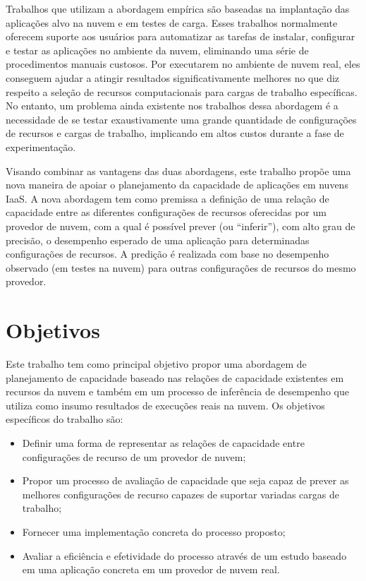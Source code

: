 Trabalhos que utilizam a abordagem empírica são baseadas na implantação das aplicações alvo na nuvem 
e em testes de carga. Esses trabalhos normalmente oferecem suporte aos usuários
para automatizar as tarefas de instalar, configurar e testar as aplicações no
ambiente da nuvem, eliminando uma série de procedimentos manuais custosos. Por
executarem no ambiente de nuvem real, eles conseguem ajudar a atingir resultados
significativamente melhores no que diz respeito a seleção de recursos
computacionais para cargas de trabalho específicas. No entanto, um problema ainda 
existente nos trabalhos dessa abordagem é a necessidade de se testar exaustivamente uma grande 
quantidade de configurações de recursos e cargas de trabalho, implicando em altos 
custos durante a fase de experimentação.

Visando combinar as vantagens das duas abordagens, este trabalho
propõe uma nova maneira de apoiar o planejamento da capacidade de aplicações
em nuvens IaaS. A nova abordagem tem como premissa a definição de uma relação 
de capacidade entre as diferentes configurações de recursos oferecidas por um 
provedor de nuvem, com a qual é possível prever (ou ``inferir''), com alto grau 
de precisão, o desempenho esperado de uma aplicação para determinadas configurações 
de recursos. A predição é realizada com base no desempenho observado (em testes 
na nuvem) para outras configurações de recursos do mesmo provedor.

\section{Objetivos}
Este trabalho tem como principal objetivo propor uma abordagem de
planejamento de capacidade baseado nas relações de capacidade existentes em
recursos da nuvem e também em um processo de inferência de desempenho 
que utiliza como insumo resultados de execuções reais na nuvem. Os objetivos
específicos do trabalho são:

\begin{itemize}
  \item Definir uma forma de representar as relações de capacidade entre
  configurações de recurso de um provedor de nuvem;
  \item Propor um processo de avaliação de capacidade que seja capaz de 
  prever as melhores configurações de recurso capazes de suportar variadas
  cargas de trabalho;
  \item Fornecer uma implementação concreta do processo proposto;
  \item Avaliar a eficiência e efetividade do processo através de um estudo
  baseado em uma aplicação concreta em um provedor de nuvem real.
\end{itemize}
 
